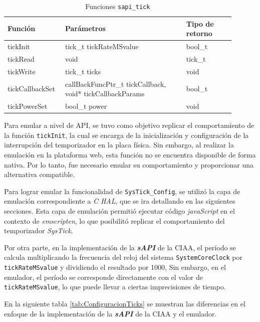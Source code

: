 \begin{table}[h]
	\centering
	\caption[Funciones \texttt{sapi\_tick}]{Funciones \texttt{sapi\_tick}}
	\begin{tabular}{p{0.20\linewidth} p{0.50\linewidth}  p{0.20\linewidth}}    
		\toprule
		\textbf{Función} 	 & \textbf{Parámetros} 		& \textbf{Tipo de retorno}  \\
		\midrule
		tickInit & tick\_t tickRateMSvalue 		&  bool\_t \\		
		tickRead	 & void				&  tick\_t \\
		tickWrite	 & tick\_t ticks 				& void \\
		tickCallbackSet	 & callBackFuncPtr\_t tickCallback, void* tickCallbackParams				&  bool\_t \\
		tickPowerSet & bool\_t power 		&  void \\	
		\bottomrule
		\hline
	\end{tabular}
	\label{tab:sapiTick}
\end{table}

Para emular a nivel de API, se tuvo como objetivo replicar el comportamiento de la función \texttt{tickInit}, la cual se encarga de la inicialización y configuración de la interrupción del temporizador en la placa física. Sin embargo, al realizar la emulación en la plataforma web, esta función no se encuentra disponible de forma nativa. Por lo tanto, fue necesario emular su comportamiento y proporcionar una alternativa compatible.

Para lograr emular la funcionalidad de \texttt{SysTick\_Config}, se utilizó la capa de emulación correspondiente a \textit{C HAL}, que se ira detallando en las siguientes secciones. Esta capa de emulación permitió ejecutar código \textit{javaScript} en el contexto de \textit{emscripten}, lo que posibilitó replicar el comportamiento del temporizador \textit{SysTick}. 

Por otra parte, en la implementación de la \textit{\textbf{sAPI}} de la CIAA, el período se calcula multiplicando la frecuencia del reloj del sistema \texttt{SystemCoreClock} por \texttt{tickRateMSvalue} y dividiendo el resultado por 1000, Sin embargo, en el emulador, el período se corresponde directamente con el valor de \texttt{tickRateMSvalue}, lo que puede llevar a ciertas imprecisiones de tiempo.

En la siguiente tabla \ref{tab:ConfiguracionTicks} se muestran las diferencias en el enfoque de la implementación de la \textit{\textbf{sAPI}} de la CIAA y el emulador.

